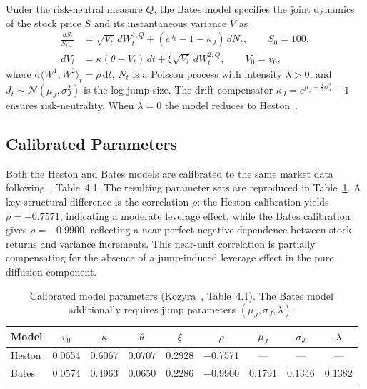 Under the risk-neutral measure $Q$, the Bates model specifies the joint
dynamics of the stock price $S$ and its instantaneous variance $V$ as
\begin{align}
  \frac{dS_t}{S_{t-}} &= \sqrt{V_t}\,dW_t^{1,Q}
    + (e^{J_t} - 1 - \kappa_J)\,dN_t, \qquad S_0 = 100,
    \label{eq:bates_s} \\[4pt]
  dV_t &= \kappa(\theta - V_t)\,dt + \xi\sqrt{V_t}\,dW_t^{2,Q},
    \qquad V_0 = v_0,
  \label{eq:bates_v}
\end{align}
where $\mathrm{d}\langle W^1, W^2\rangle_t = \rho\,\mathrm{d}t$,
$N_t$ is a Poisson process with intensity $\lambda > 0$, and
$J_t \sim \mathcal{N}(\mu_J, \sigma_J^2)$ is the log-jump size.  The
drift compensator $\kappa_J = e^{\mu_J + \frac{1}{2}\sigma_J^2} - 1$
ensures risk-neutrality.  When $\lambda = 0$ the model reduces to
Heston~\citep{heston1993closed}.

\subsection{Calibrated Parameters}
\label{sec:bates_params}

Both the Heston and Bates models are calibrated to the same market data
following~\citep{kozyra2006}, Table~4.1.  The resulting parameter sets
are reproduced in Table~\ref{tab:calibrated_params}.  A key structural
difference is the correlation $\rho$: the Heston calibration yields
$\rho = -0.7571$, indicating a moderate leverage effect, while the Bates
calibration gives $\rho = -0.9900$, reflecting a near-perfect negative
dependence between stock returns and variance increments.  This near-unit
correlation is partially compensating for the absence of a jump-induced
leverage effect in the pure diffusion component.

\begin{table}[htbp]
  \centering
  \caption{Calibrated model parameters (Kozyra~\citep{kozyra2006},
    Table~4.1).  The Bates model additionally requires jump parameters
    $(\mu_J, \sigma_J, \lambda)$.}
  \label{tab:calibrated_params}
  \begin{tabular}{lcccccccc}
    \hline
    Model  & $v_0$  & $\kappa$ & $\theta$ & $\xi$  & $\rho$   &
             $\mu_J$ & $\sigma_J$ & $\lambda$ \\
    \hline
    Heston & 0.0654 & 0.6067   & 0.0707   & 0.2928 & $-$0.7571 &
             ---     & ---        & ---       \\
    Bates  & 0.0574 & 0.4963   & 0.0650   & 0.2286 & $-$0.9900 &
             0.1791  & 0.1346     & 0.1382    \\
    \hline
  \end{tabular}
\end{table}

